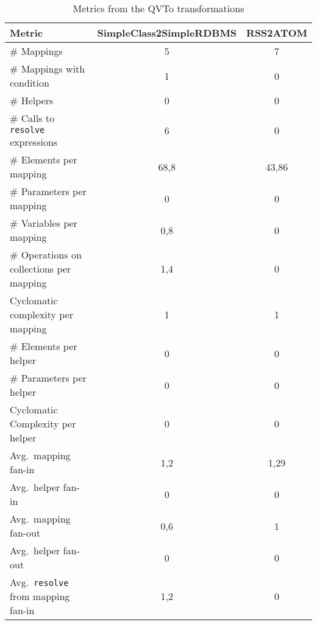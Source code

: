 \begin{table}[htb]
\centering\small
\begin{tabular}{|l|c|c|}
\hline
Metric & SimpleClass2SimpleRDBMS & RSS2ATOM \\
\hline
\# Mappings & 5 & 7 \\
\hline
\# Mappings with condition & 1 & 0 \\
\hline
\# Helpers & 0 & 0 \\
\hline
\# Calls to \texttt{resolve} expressions & 6 & 0 \\
\hline
\# Elements per mapping & 68,8 & 43,86 \\
\hline
\# Parameters per mapping & 0 & 0 \\
\hline
\# Variables per mapping & 0,8 & 0 \\
\hline
\# Operations on collections per mapping & 1,4 & 0 \\
\hline
Cyclomatic complexity per mapping & 1 & 1 \\
\hline
\# Elements per helper & 0 & 0 \\
\hline
\# Parameters per helper & 0 & 0 \\
\hline
Cyclomatic Complexity per helper & 0 & 0 \\
\hline
Avg.\ mapping fan-in & 1,2 & 1,29 \\
\hline
Avg.\ helper fan-in & 0 & 0 \\
\hline
Avg.\ mapping fan-out & 0,6 & 1 \\
\hline
Avg.\ helper fan-out & 0 & 0 \\
\hline
Avg.\ \texttt{resolve} from mapping fan-in & 1,2 & 0 \\
\hline
\end{tabular}
\normalsize
\caption{Metrics from the QVTo transformations}
\label{tab:metrics:QVTo}
\end{table} 